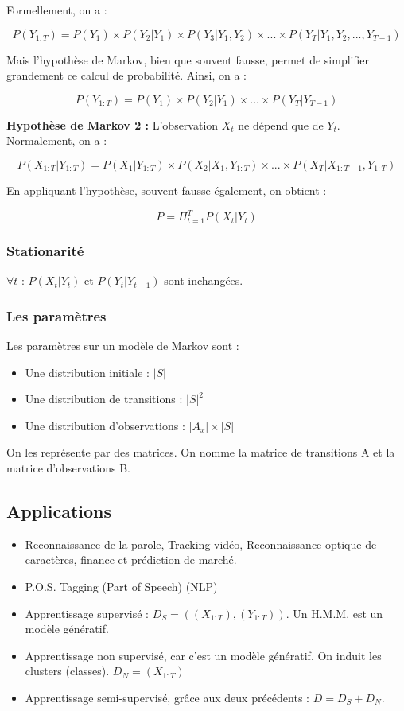 \documentclass{article}
\begin{document}
Formellement, on a :

\[ P(Y_{1:T}) = P(Y_1) \times P(Y_2 | Y_1) \times P(Y_3 | Y_1, Y_2) \times ... \times P(Y_T | Y_1, Y_2, ..., Y_{T-1}) \]

Mais l'hypothèse de Markov, bien que souvent fausse, permet de simplifier grandement ce calcul de probabilité. Ainsi, on a :

\[ P(Y_{1:T}) = P(Y_1) \times P(Y_2 | Y_1) \times ... \times P(Y_T | Y_{T-1}) \]

\textbf{Hypothèse de Markov 2 :} L'observation $X_t$ ne dépend que de $Y_t$. \\

Normalement, on a :

\[ P(X_{1:T} | Y_{1:T}) = P(X_1 | Y_{1:T}) \times P(X_2 | X_1, Y_{1:T}) \times ... \times P(X_T | X_{1:T-1}, Y_{1:T}) \]

En appliquant l'hypothèse, souvent fausse également, on obtient :

\[ P = \Pi_{t = 1}^{T} P(X_t | Y_t)  \]

\subsubsection{Stationarité}

$ \forall t$ : $P(X_t | Y_t)$ et $P(Y_t | Y_{t - 1})$ sont inchangées.

\subsubsection{Les paramètres}
Les paramètres sur un modèle de Markov sont : 

\begin{itemize}
\item Une distribution initiale : $|S|$
\item Une distribution de transitions : $|S|^2$
\item Une distribution d'observations : $|A_x| \times |S|$
\end{itemize}

On les représente par des matrices. On nomme la matrice de transitions A et la matrice d'observations B.

\subsection{Applications}

\begin{itemize}
\item Reconnaissance de la parole, Tracking vidéo, Reconnaissance optique de caractères, finance et prédiction de marché.
\item P.O.S. Tagging (Part of Speech) (NLP)
\item Apprentissage supervisé : $D_S = ((X_{1:T}), (Y_{1:T}))$. Un H.M.M. est un modèle génératif.
\item Apprentissage non supervisé, car c'est un modèle génératif. On induit les clusters (classes). $D_N = (X_{1:T})$
\item Apprentissage semi-supervisé, grâce aux deux précédents : $D = D_S + D_N$.
\end{itemize}
\end{document}
